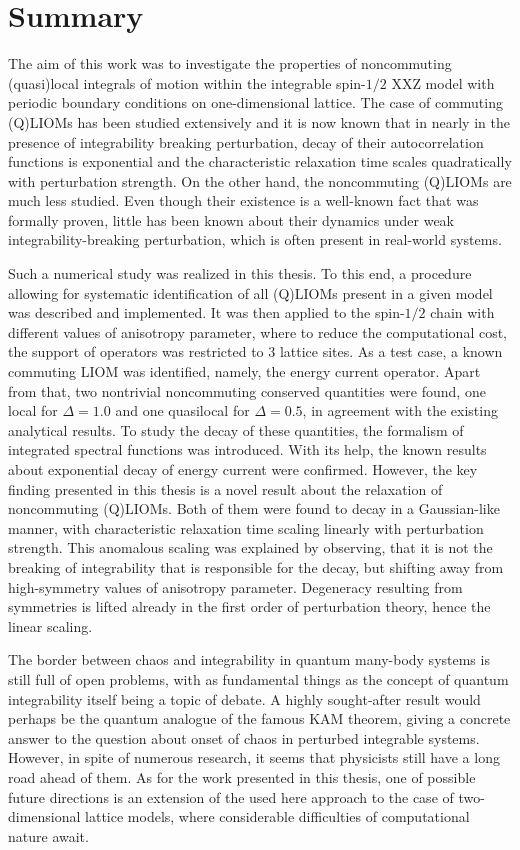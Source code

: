 \chapter{Summary}
\thispagestyle{chapterBeginStyle}
The aim of this work was to investigate the properties of noncommuting (quasi)local integrals of
motion within the integrable spin-\(1/2\) XXZ model with periodic boundary conditions
on one-dimensional lattice. The case of commuting (Q)LIOMs has been studied extensively
and it is now known that in nearly in the presence of integrability breaking perturbation, 
decay of their autocorrelation functions is exponential and the characteristic relaxation
time scales quadratically with perturbation strength. On the other hand, the noncommuting
(Q)LIOMs are much less studied. Even though their existence is a well-known fact that was
formally proven,  little has been known about their dynamics under weak integrability-breaking
perturbation, which is often present in real-world systems.

Such a numerical study was realized in this thesis. To this end, a procedure allowing for 
systematic identification of all (Q)LIOMs present in a given model was described and implemented.
It was then applied to the spin-\(1/2\) chain with different values of anisotropy parameter,
where to reduce the computational cost, the support of operators was restricted to \(3\) lattice sites.
As a test case, a known commuting LIOM was identified, namely, the energy current operator.
Apart from that, two nontrivial noncommuting conserved  quantities were found, one local for
\(\Delta = 1.0\) and one quasilocal for \(\Delta=0.5\), in agreement with the existing analytical
results. To study the decay of these quantities, the formalism of integrated spectral
functions was introduced. With its help, the known results about exponential
decay of energy current were confirmed. However, the key finding presented in this thesis 
is a novel result about the relaxation of noncommuting (Q)LIOMs. Both of them were found
to decay in a Gaussian-like manner, with characteristic relaxation time scaling linearly
with perturbation strength. This anomalous scaling was explained by observing, that
it is not the breaking of integrability that is responsible for the decay, but shifting
away from high-symmetry values of anisotropy parameter. Degeneracy resulting from
symmetries is lifted already in the first order of perturbation theory, hence the linear scaling.

The border between chaos and integrability in quantum many-body systems is still full
of open problems, with as fundamental things as the concept of quantum integrability itself
being a topic of debate. A highly sought-after result would perhaps be the quantum analogue
of the famous KAM theorem, giving a concrete answer to the question about onset of chaos
in perturbed integrable systems. However, in spite of numerous research, it seems that
physicists still have a long road ahead of them. As for the work presented in this thesis,
one of possible future directions is an extension of the used here approach to the
case of two-dimensional lattice models, where considerable difficulties of computational
nature await.